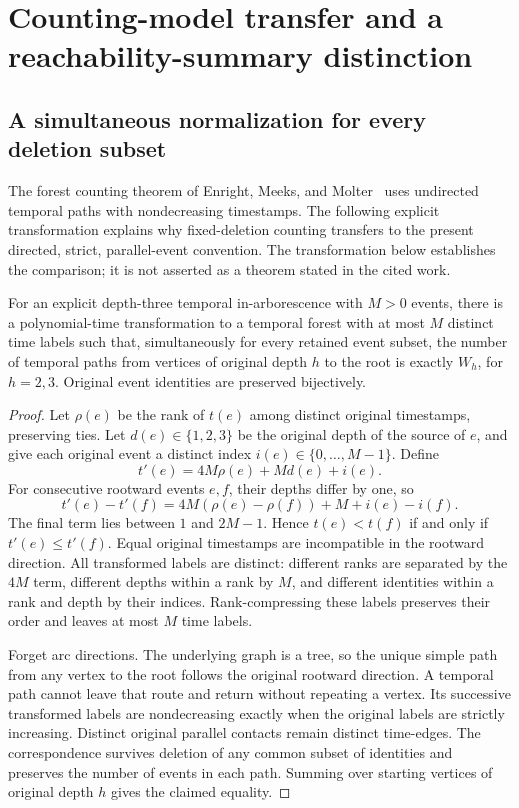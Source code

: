 \section{Counting-model transfer and a reachability-summary distinction}

\subsection{A simultaneous normalization for every deletion subset}
\label{app:counting}

The forest counting theorem of Enright, Meeks, and
Molter~\citep{enright2025counting} uses undirected temporal paths with
nondecreasing timestamps. The following explicit transformation explains
why fixed-deletion counting transfers to the present directed, strict,
parallel-event convention. The transformation below establishes the comparison;
it is not asserted as a theorem stated in the cited work.

\begin{proposition}
For an explicit depth-three temporal in-arborescence with $M>0$ events, there
is a polynomial-time transformation to a temporal forest with at most $M$
distinct time labels such that, simultaneously for every retained event
subset, the number of temporal paths from vertices of original depth $h$
to the root is exactly $W_h$, for $h=2,3$. Original event identities are
preserved bijectively.
\end{proposition}

\begin{proof}
Let $\rho(e)$ be the rank of $t(e)$ among distinct original timestamps,
preserving ties. Let $d(e)\in\{1,2,3\}$ be the original depth of the source
of $e$, and give each original event a distinct index
$i(e)\in\{0,\ldots,M-1\}$. Define
\[
 t'(e)=4M\rho(e)+Md(e)+i(e).
\]
For consecutive rootward events $e,f$, their depths differ by one, so
\[
 t'(e)-t'(f)=4M(\rho(e)-\rho(f))+M+i(e)-i(f).
\]
The final term lies between $1$ and $2M-1$. Hence
$t(e)<t(f)$ if and only if $t'(e)\le t'(f)$. Equal original timestamps
are incompatible in the rootward direction. All transformed labels are
distinct: different ranks are separated by the $4M$ term, different depths
within a rank by $M$, and different identities within a rank and depth by
their indices. Rank-compressing these labels preserves their order and
leaves at most $M$ time labels.

Forget arc directions. The underlying graph is a tree, so the unique simple
path from any vertex to the root follows the original rootward direction.
A temporal path cannot leave that route and return without repeating a
vertex. Its successive transformed labels are nondecreasing exactly when
the original labels are strictly increasing. Distinct original parallel
contacts remain distinct time-edges. The correspondence survives deletion
of any common subset of identities and preserves the number of events in
each path. Summing over starting vertices of original depth $h$ gives the
claimed equality.
\end{proof}

